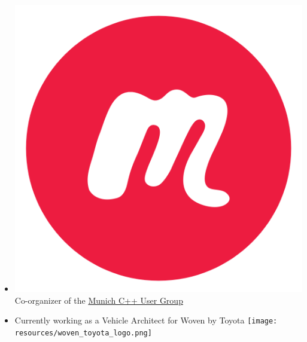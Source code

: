 \documentclass[aspectratio=169]{beamer}
\begin{document}
\begin{frame}[fragile]
\begin{itemize}
    \item \includegraphics[height=.05\textheight]{resources/meetup-icon.png} Co-organizer of the \href{https://www.meetup.com/MUCplusplus/}{Munich C++ User Group}

    \item Currently working as a Vehicle Architect for Woven by Toyota \texttt{[image: resources/woven\_toyota\_logo.png]}

  \end{itemize}
\end{frame}

\end{document}
